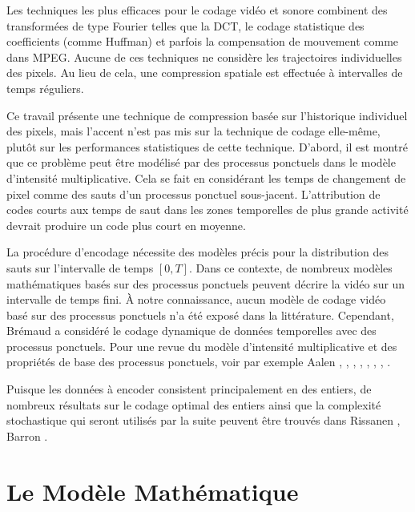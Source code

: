 \documentclass[11pt,a4paper]{article}
\begin{document}
	Les techniques les plus efficaces pour le codage vidéo et sonore combinent des transformées de type Fourier telles que la DCT, le codage statistique des coefficients (comme Huffman) et parfois la compensation de mouvement comme dans MPEG. Aucune de ces techniques ne considère les trajectoires individuelles des pixels. Au lieu de cela, une compression spatiale est effectuée à intervalles de temps réguliers.
	
	Ce travail présente une technique de compression basée sur l'historique individuel des pixels, mais l'accent n'est pas mis sur la technique de codage elle-même, plutôt sur les performances statistiques de cette technique. D'abord, il est montré que ce problème peut être modélisé par des processus ponctuels dans le modèle d'intensité multiplicative. Cela se fait en considérant les temps de changement de pixel comme des sauts d'un processus ponctuel sous-jacent. L'attribution de codes courts aux temps de saut dans les zones temporelles de plus grande activité devrait produire un code plus court en moyenne.
	
	La procédure d'encodage nécessite des modèles précis pour la distribution des sauts sur l'intervalle de temps $[0,T]$. Dans ce contexte, de nombreux modèles mathématiques basés sur des processus ponctuels peuvent décrire la vidéo sur un intervalle de temps fini. À notre connaissance, aucun modèle de codage vidéo basé sur des processus ponctuels n'a été exposé dans la littérature. Cependant, Brémaud a considéré le codage dynamique de données temporelles avec des processus ponctuels. Pour une revue du modèle d'intensité multiplicative et des propriétés de base des processus ponctuels, voir par exemple Aalen \cite{Aalen75}, \cite{Aalen1978c}, \cite{Aalen1978a}, \cite{Andersen1985}, \cite{Andersen1982a}, \cite{Csorgo1982}, \cite{Campbell1982}, \cite{Anderson1980}.
	
	Puisque les données à encoder consistent principalement en des entiers, de nombreux résultats sur le codage optimal des entiers ainsi que la complexité stochastique qui seront utilisés par la suite peuvent être trouvés dans Rissanen \cite{Rissanen83}, Barron \cite{Barron85}.
	
	\section{Le Modèle Mathématique}
	\label{sec:modele_mathematique}
	
\end{document}
